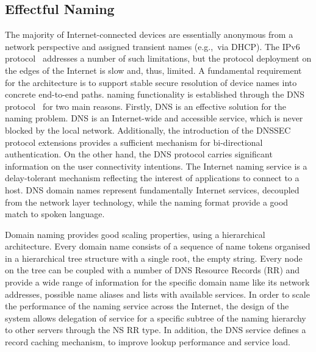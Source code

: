 \subsection{Effectful Naming} \label{signpost-naming}

The majority of Internet-connected devices are essentially anonymous from a
network perspective and assigned transient names (e.g.,~via DHCP). The IPv6
protocol~\cite{RFC1883} addresses a number of such limitations, but the protocol
deployment on the edges of the Internet is slow and, thus, limited. A
fundamental requirement for the \signpost architecture is to support stable
secure resolution of device  names into
concrete end-to-end paths.  \signpost naming functionality is established
through the DNS protocol~\cite{RFC1034} for two main reasons.  Firstly, DNS is
an effective solution for the naming problem. DNS is an Internet-wide and
accessible service, which is never blocked by the local network. Additionally,
the introduction of the DNSSEC protocol extensions provides a sufficient
mechanism for bi-directional authentication.  On the other hand, the DNS
protocol carries significant information on the user connectivity intentions. 
The Internet naming service is a delay-tolerant mechanism reflecting
the interest of applications to connect to a host. DNS domain names represent
fundamentally Internet services, decoupled from the network layer technology,
while the naming format provide a good match to spoken language. 

Domain naming provides good scaling properties, using a hierarchical
architecture. Every domain name consists of a sequence of name tokens organised
in a hierarchical tree structure with a single root, the empty string. Every
node on the tree can be coupled with a number of DNS Resource Records (RR) and
provide a wide range of information for the specific domain name like its
network addresses, possible name aliases and lists with available services. In
order to scale the performance of the naming service across the Internet, the
design of the system allows delegation of service for a specific subtree of the
naming hierarchy to other servers through the NS RR type. 
In addition, the DNS service
defines a record caching mechanism, to improve lookup performance and service
load. 

